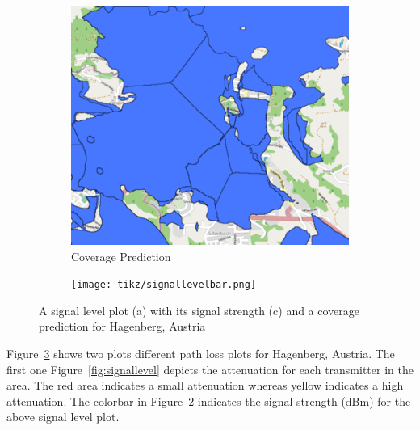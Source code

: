 \documentclass[master,english]{hgbthesis}
\begin{document}
\begin{figure}
\begin{subfigure}[b]{0.45\textwidth}
		\includegraphics[width=\textwidth]{coveragemapsmall.png}

		\caption{Coverage Prediction}

		\label{fig:coveragepred}

	\end{subfigure}

\begin{subfigure}[b]{\textwidth}

		\texttt{[image: tikz/signallevelbar.png]}

		\caption{}

		\label{fig:signallevelbar}

	\end{subfigure}

	\caption{A signal level plot (a) with its signal strength (c) and a coverage prediction for Hagenberg, Austria }

	\label{fig:cellarea}

\end{figure}

Figure~\ref{fig:cellarea} shows two plots different path loss plots for Hagenberg, Austria. The first one Figure~\ref{fig:signallevel} depicts the attenuation for each transmitter in the area. The red area indicates a small attenuation whereas yellow indicates a high attenuation. The colorbar in Figure~\ref{fig:signallevelbar} indicates the signal strength (dBm) for the above signal level plot.

\end{document}
